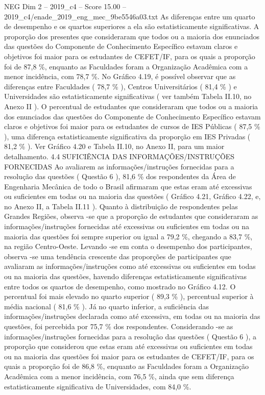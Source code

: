 \begin{textsample}{NEG Dim 2 – 2019\_c4 – Score 15.00 – 2019\_c4/enade\_2019\_eng\_mec\_9be5546a03.txt}
As diferenças entre um quarto de desempenho e os quartos superiores a ela são estatisticamente significativas.
A proporção dos presentes que consideraram que todos ou a maioria dos enunciados das questões do Componente de Conhecimento Específico estavam claros e objetivos foi maior para os estudantes de CEFET/IF, para os quais a proporção foi de 87,8 \%, enquanto as Faculdades foram a Organização Acadêmica com a menor incidência, com 78,7 \%.
No Gráfico 4.19, é possível observar que as diferenças entre Faculdades ( 78,7 \% ), Centros Universitários ( 81,4 \% ) e Universidades são estatisticamente significativas ( ver também Tabela II.10, no Anexo II ).
O percentual de estudantes que consideraram que todos ou a maioria dos enunciados das questões do Componente de Conhecimento Específico estavam claros e objetivos foi maior para os estudantes de cursos de IES Públicas ( 87,5 \% ), uma diferença estatisticamente significativa da proporção em IES Privadas ( 81,2 \% ).
Ver Gráfico 4.20 e Tabela II.10, no Anexo II, para um maior detalhamento. 4.4 SUFICIÊNCIA DAS INFORMAÇÕES/INSTRUÇÕES FORNECIDAS Ao avaliarem as informações/instruções fornecidas para a resolução das questões ( Questão 6 ), 81,6 \% dos respondentes da Área de Engenharia Mecânica de todo o Brasil afirmaram que estas eram até excessivas ou suficientes em todas ou na maioria das questões ( Gráfico 4.21, Gráfico 4.22, e, no Anexo II, a Tabela II.11 ).
Quanto à distribuição de respondentes pelas Grandes Regiões, observa -se que a proporção de estudantes que consideraram as informações/instruções fornecidas até excessivas ou suficientes em todas ou na maioria das questões foi sempre superior ou igual a 79,2 \%, chegando a 83,7 \%, na região Centro-Oeste.
Levando -se em conta o desempenho dos participantes, observa -se uma tendência crescente das proporções de participantes que avaliaram as informações/instruções como até excessivas ou suficientes em todas ou na maioria das questões, havendo diferenças estatisticamente significativas entre todos os quartos de desempenho, como mostrado no Gráfico 4.12.
O percentual foi mais elevado no quarto superior ( 89,3 \% ), percentual superior à média nacional ( 81,6 \% ).
Já no quarto inferior, a suficiência das informações/instruções declarada como até excessiva, em todas ou na maioria das questões, foi percebida por 75,7 \% dos respondentes.
Considerando -se as informações/instruções fornecidas para a resolução das questões ( Questão 6 ), a proporção que considerou que estas eram até excessivas ou suficientes em todas ou na maioria das questões foi maior para os estudantes de CEFET/IF, para os quais a proporção foi de 86,8 \%, enquanto as Faculdades foram a Organização Acadêmica com a menor incidência, com 76,5 \%, ainda que sem diferença estatisticamente significativa de Universidades, com 84,0 \%.

\end{textsample}
